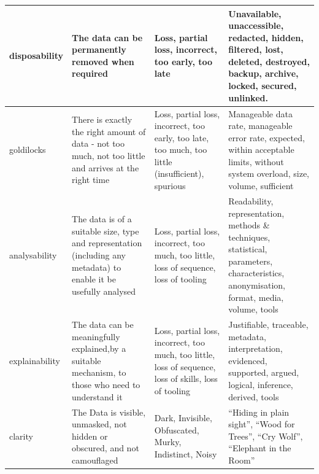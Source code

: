 \begin{longtable}{|L{}|L{}|L{}|L{}|}
  \hline
  \Gls{disposability} & The data can be permanently removed when required & Loss, partial loss, incorrect, too early, too late & Unavailable, unaccessible, redacted, hidden, filtered, lost, deleted, destroyed, backup, archive, locked, secured, unlinked.\\
  \hline
  \Gls{goldilocks} &
  There is exactly the right amount of data - not too much, not too little and arrives at the right time &
  {Loss, partial loss, incorrect, too early, too late, too much, too little (insufficient), spurious} &
  Manageable data rate, manageable error rate, expected, within acceptable limits, without system overload, size, volume, sufficient\\
  \hline
  \Gls{analysability} &
  The data is of a suitable size, type and representation (including any \gls{metadata}) to enable it be usefully analysed &
  {Loss, partial loss, incorrect, too much, too little, loss of sequence, loss of tooling} &
  Readability, representation, methods \& techniques, statistical, parameters, characteristics, anonymisation, \gls{format}, media, volume, tools
  \\
  \hline
  \Gls{explainability} &
  The data can be meaningfully explained,by a suitable mechanism, to those who need to understand it &
  {Loss, partial loss, incorrect, too much, too little, loss of sequence, loss of skills, loss of tooling} &
  Justifiable, traceable, \gls{metadata}, interpretation, evidenced, supported, argued, logical, inference, derived, tools
  \\
  \hline
  \Gls{clarity}&
  The Data is visible, unmasked, not hidden or obscured, and not camouflaged &
  Dark, Invisible, Obfuscated, Murky, Indistinct, Noisy & ``Hiding in plain sight'', ``Wood for Trees'', ``Cry Wolf'', ``Elephant in the Room''
  \\
  \hline
\end{longtable}

